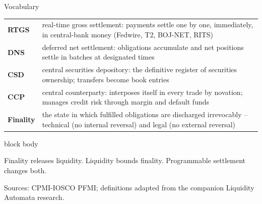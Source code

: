 \documentclass[aspectratio=169,12pt]{beamer}
\newcommand{\rust}[1]{\textcolor{Rust}{\textbf{#1}}}
\newcommand{\source}[1]{\vfill\par\fontsize{5.4}{6.5}\selectfont\color{Quiet}Sources: #1}
\newenvironment{statement}{%
  \begin{beamercolorbox}[sep=.18cm,rounded=false,wd=\linewidth]{block body}%
  \fontsize{13}{15.5}\selectfont\bfseries
}{\end{beamercolorbox}}
\begin{document}
\begin{frame}[shrink=15]{Vocabulary} %
  \fontsize{9.8}{11.8}\selectfont
  \begin{tabularx}{\textwidth}{L{2.3cm}Y}
    \toprule
    \rust{RTGS} & real-time gross settlement: payments settle one by one, immediately, in central-bank money (Fedwire, T2, BOJ-NET, RITS) \\
    \addlinespace[0.22em]
    \rust{DNS} & deferred net settlement: obligations accumulate and net positions settle in batches at designated times \\
    \addlinespace[0.22em]
    \rust{CSD} & central securities depository: the definitive register of securities ownership; transfers become book entries \\
    \addlinespace[0.22em]
    \rust{CCP} & central counterparty: interposes itself in every trade by novation; manages credit risk through margin and default funds \\
    \addlinespace[0.22em]
    \rust{Finality} & the state in which fulfilled obligations are discharged irrevocably -- technical (no internal reversal) and legal (no external reversal) \\
    \bottomrule
  \end{tabularx}
  \vspace{0.14cm}
  \begin{statement}
    Finality releases liquidity. Liquidity bounds finality. Programmable settlement changes both.
  \end{statement}
  \source{CPMI-IOSCO PFMI; definitions adapted from the companion Liquidity Automata research.}
\end{frame}
\end{document}
